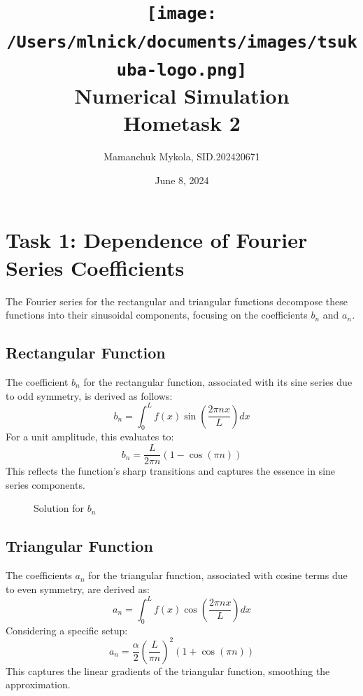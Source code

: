 \documentclass{article}
\title{
    \texttt{[image: /Users/mlnick/documents/images/tsukuba-logo.png]} \\
    \vspace{2mm}
    \textbf{Numerical Simulation} \\
    \vspace{3mm}    
    Hometask 2
}
\author{Mamanchuk Mykola, SID.202420671}
\date{June 8, 2024}
\begin{document}
\maketitle

\section*{Task 1: Dependence of Fourier Series Coefficients}

The Fourier series for the rectangular and triangular functions decompose these functions into their sinusoidal components, focusing on the coefficients $b_n$ and $a_n$. 

\subsection*{Rectangular Function}
The coefficient $b_n$ for the rectangular function, associated with its sine series due to odd symmetry, is derived as follows:
\[
b_n = \int_0^L f(x) \sin\left(\frac{2\pi nx}{L}\right) dx
\]
For a unit amplitude, this evaluates to:
\[
b_n = \frac{L}{2\pi n} (1 - \cos(\pi n))
\]
This reflects the function's sharp transitions and captures the essence in sine series components.

\setlength{\fboxsep}{0pt} %
\setlength{\fboxrule}{0.5pt} %

\begin{figure}[h]
    \centering
    \caption{Solution for \( b_n \)}
    \label{fig:bn_solution}
\end{figure}

\subsection*{Triangular Function}
The coefficients $a_n$ for the triangular function, associated with cosine terms due to even symmetry, are derived as:
\[
a_n = \int_0^L f(x) \cos\left(\frac{2\pi nx}{L}\right) dx
\]
Considering a specific setup:
\[
a_n = \frac{\alpha}{2} \left(\frac{L}{\pi n}\right)^2 (1 + \cos(\pi n))
\]
This captures the linear gradients of the triangular function, smoothing the approximation.
\end{document}
